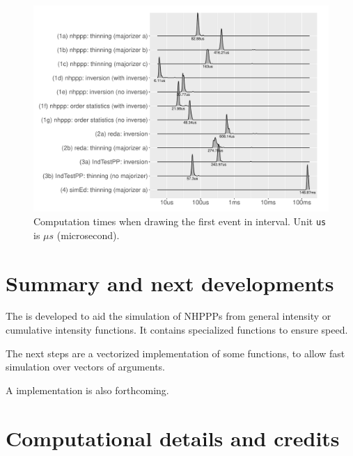 \documentclass[article,nojss]{jss}\usepackage[]{graphicx}\usepackage[]{xcolor}
\makeatletter
\def\maxwidth{ %
  \ifdim\Gin@nat@width>\linewidth
    \linewidth
  \else
    \Gin@nat@width
  \fi
}
\newenvironment{knitrout}{}{} %
\makeatother
\begin{document}
\begin{knitrout}
\color{fgcolor}\begin{figure}
\includegraphics[width=\maxwidth]{figure/comptimes_one_sample-1} \caption[Computation times when drawing the first event in interval]{Computation times when drawing the first event in interval. Unit \texttt{us} is $\mu s$ (microsecond).}\label{fig:comptimes_one_sample}
\end{figure}

\end{knitrout}


\section{Summary and next developments} \label{sec:summary}

The  is developed to aid the simulation of NHPPPs from general intensity or cumulative intensity functions. It contains specialized functions to ensure speed.

The next steps are a vectorized implementation of some functions, to allow fast simulation over vectors of arguments.

A  implementation is also forthcoming.



\section*{Computational details and credits}
\end{document}
